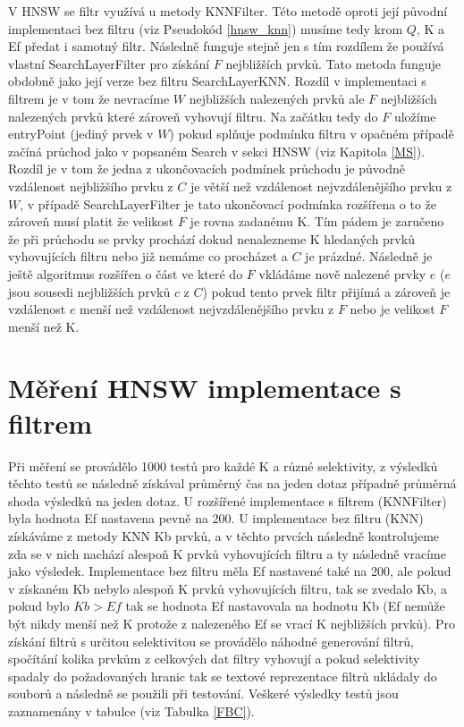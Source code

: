 \documentclass[czech,semestral,dept460,male,csharp,cpdeclaration]{diploma}
\begin{document}
		V HNSW se filtr využívá u metody KNNFilter. Této metodě oproti její původní implementaci bez filtru (viz Pseudokód \ref{hnsw_knn}) musíme tedy krom $Q$, K a Ef předat i samotný filtr. Následně funguje stejně jen s tím rozdílem že používá vlastní SearchLayerFilter pro získání $F$ nejbližších prvků. Tato metoda funguje obdobně jako její verze bez filtru SearchLayerKNN. Rozdíl v implementaci s filtrem je v tom že nevracíme $W$ nejbližších nalezených prvků ale $F$ nejbližších nalezených prvků které zároveň vyhovují filtru. Na začátku tedy do $F$ uložíme entryPoint (jediný prvek v $W$) pokud splňuje podmínku filtru v opačném případě začíná průchod jako v popsaném Search v sekci HNSW (viz Kapitola \ref{MS}). Rozdíl je v tom že jedna z ukončovacích podmínek průchodu je původně vzdálenost nejbližšího prvku z $C$ je větší než vzdálenost nejvzdálenějšího prvku z $W$, v případě SearchLayerFilter je tato ukončovací podmínka rozšířena o to že zároveň musí platit že velikost $F$ je rovna zadanému K. Tím pádem je zaručeno že při průchodu se prvky prochází dokud nenalezneme K hledaných prvků vyhovujících filtru nebo již nemáme co procházet a $C$ je prázdné. Následně je ještě algoritmus rozšířen o část ve které do $F$ vkládáme nově nalezené prvky $e$ ($e$ jsou sousedi nejbližších prvků $c$ z $C$) pokud tento prvek filtr přijímá a zároveň je vzdálenost $e$ menší než vzdálenost nejvzdálenějšího prvku z $F$ nebo je velikost $F$ menší než K.
		
		\section{Měření HNSW implementace s filtrem}
		
		Při měření se provádělo 1000 testů pro každé K a různé selektivity, z výsledků těchto testů se následně získával průměrný čas na jeden dotaz případně průměrná shoda výsledků na jeden dotaz. U rozšířené implementace s filtrem (KNNFilter) byla hodnota Ef nastavena pevně na 200. U implementace bez filtru (KNN) získáváme z metody KNN Kb prvků, a v těchto prvcích následně kontrolujeme zda se v nich nachází alespoň K prvků vyhovujících filtru a ty následně vracíme jako výsledek. Implementace bez filtru měla Ef nastavené také na 200, ale pokud v získaném Kb nebylo alespoň K prvků vyhovujících filtru, tak se zvedalo Kb, a pokud bylo $Kb > Ef$ tak se hodnota Ef nastavovala na hodnotu Kb (Ef nemůže být nikdy menší než K protože z nalezeného Ef se vrací K nejbližších prvků). Pro získání filtrů s určitou selektivitou se provádělo náhodné generování filtrů, spočítání kolika prvkům z celkových dat filtry vyhovují a pokud selektivity spadaly do požadovaných hranic tak se textové reprezentace filtrů ukládaly do souborů a následně se použili při testování. Veškeré výsledky testů jsou zaznamenány v tabulce (viz Tabulka \ref{FBC}).
		
\end{document}
